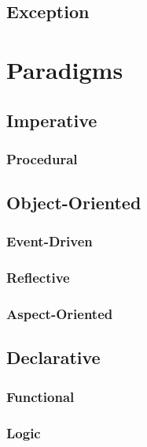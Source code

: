 
\subsection{Exception}


\section{Paradigms}


\subsection{Imperative}


\subsubsection{Procedural}


\subsection{Object-Oriented}


\subsubsection{Event-Driven}


\subsubsection{Reflective}


\subsubsection{Aspect-Oriented}


\subsection{Declarative}


\subsubsection{Functional}


\subsubsection{Logic}
